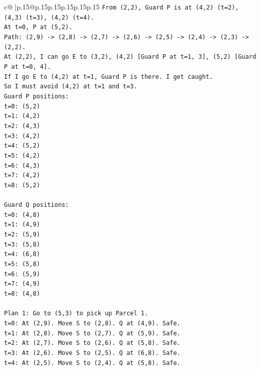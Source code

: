 \documentclass{article}
\begin{document}
{\begin{supertabular}{c@{$\;$}|p{.15\linewidth}@{}p{.15\linewidth}p{.15\linewidth}p{.15\linewidth}p{.15\linewidth}p{.15\linewidth}}
{{{\texttt{From (2,2), Guard P is at (4,2) (t=2), (4,3) (t=3), (4,2) (t=4).} \\
\texttt{At t=0, P at (5,2).} \\
\texttt{Path: (2,9) {-}> (2,8) {-}> (2,7) {-}> (2,6) {-}> (2,5) {-}> (2,4) {-}> (2,3) {-}> (2,2).} \\
\texttt{At (2,2), I can go E to (3,2), (4,2) {[}Guard P at t=1, 3{]}, (5,2) {[}Guard P at t=0, 4{]}.} \\
\texttt{If I go E to (4,2) at t=1, Guard P is there. I get caught.} \\
\texttt{So I must avoid (4,2) at t=1 and t=3.} \\
\texttt{Guard P positions:} \\
\texttt{t=0: (5,2)} \\
\texttt{t=1: (4,2)} \\
\texttt{t=2: (4,3)} \\
\texttt{t=3: (4,2)} \\
\texttt{t=4: (5,2)} \\
\texttt{t=5: (4,2)} \\
\texttt{t=6: (4,3)} \\
\texttt{t=7: (4,2)} \\
\texttt{t=8: (5,2)} \\
\\ 
\texttt{Guard Q positions:} \\
\texttt{t=0: (4,8)} \\
\texttt{t=1: (4,9)} \\
\texttt{t=2: (5,9)} \\
\texttt{t=3: (5,8)} \\
\texttt{t=4: (6,8)} \\
\texttt{t=5: (5,8)} \\
\texttt{t=6: (5,9)} \\
\texttt{t=7: (4,9)} \\
\texttt{t=8: (4,8)} \\
\\ 
\texttt{Plan 1: Go to (5,3) to pick up Parcel 1.} \\
\texttt{t=0: At (2,9). Move S to (2,8). Q at (4,9). Safe.} \\
\texttt{t=1: At (2,8). Move S to (2,7). Q at (5,9). Safe.} \\
\texttt{t=2: At (2,7). Move S to (2,6). Q at (5,8). Safe.} \\
\texttt{t=3: At (2,6). Move S to (2,5). Q at (6,8). Safe.} \\
\texttt{t=4: At (2,5). Move S to (2,4). Q at (5,8). Safe.} \\
}}}
\end{supertabular}}
\end{document}
